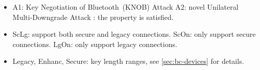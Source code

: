 \documentclass[../main.tex]{subfiles}  %
\begin{document}
\begin{table}[t]
\begin{threeparttable}[b]
\begin{tabularx}{\textwidth}{c>{\centering\arraybackslash}X>{\centering\arraybackslash}X>{\centering\arraybackslash}X>{\centering\arraybackslash}X>{\centering\arraybackslash}X>{\centering\arraybackslash}X}
    \hline
    \end{tabularx}
    \begin{tablenotes}
        \item[] 
        \begin{itemize}[leftmargin=*]
            \item   \hspace{0.25em} A1: Key Negotiation of Bluetooth~(KNOB) Attack\cite{antonioli2019knob} 
                    \hspace{1em} A2: novel Unilateral Multi-Downgrade Attack 
                    \hspace{1em} \textcolor{xhs_green}{}: the property is satisfied. 
            \item   \hspace{0.25em} ScLg: support both secure and legacy connections.
                    \hspace{1em} ScOn: only support secure connections.
                    \hspace{1em} LgOn: only support legacy connections.
            \item   \hspace{0.25em} Legacy, Enhanc, Secure: key length ranges, see \autoref{sec:bc-devices} for details.
        \end{itemize}
    \end{tablenotes}
    \end{threeparttable}
\end{table}
\end{document}
